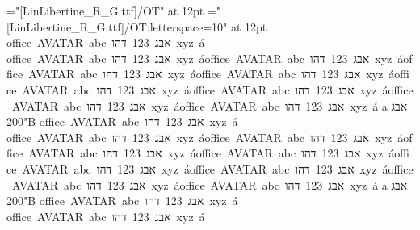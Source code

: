 \nopagenumbers
\font\regular="[LinLibertine_R_G.ttf]/OT" at 12pt
\font\spaced="[LinLibertine_R_G.ttf]/OT:letterspace=10" at 12pt
\def\sample{office AVATAR abc אבג 123 דהו xyz á}
\regular
{}
\hbox{\sample}
\hbox{\sample\sample\sample\sample\sample\sample\sample\sample}
\hbox{a}
\hbox{אבג}
\hbox{\char"200B}
\hbox{}
\spaced
\hbox{\sample}
\hbox{\sample\sample\sample\sample\sample\sample\sample\sample}
\hbox{a}
\hbox{אבג}
\hbox{\char"200B}
\regular\hbox{\sample}
\spaced\hbox{\sample}
\bye
